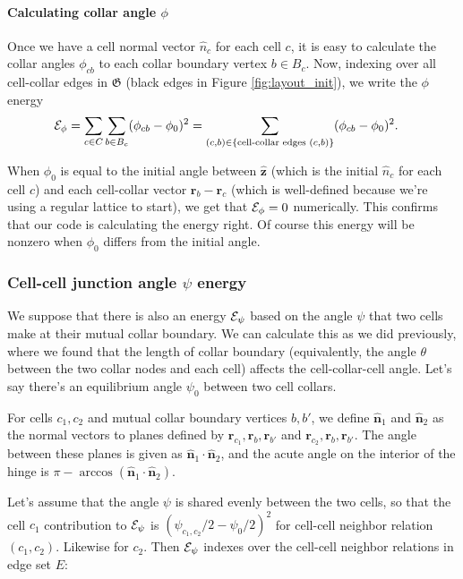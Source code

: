 \paragraph{Calculating collar angle $\phi$}
Once we have a cell normal vector $\hat{n}_c$ for each cell $c$, it is easy to calculate the collar angles $\phi_{cb}$ to each collar boundary vertex $b\in B_c$. Now, indexing over all cell-collar edges in $\mathfrak{G}$ (black edges in Figure \ref{fig:layout_init}), we write the $\phi$ energy
\begin{align*}
    \mathcal{E}_\phi &= \sum_{c\in C} \sum_{b \in B_c} (\phi_{cb} - \phi_0)^2 = \sum_{(c,b) \in \{\text{cell-collar edges }(c,b) \}} (\phi_{cb} - \phi_0)^2.
\end{align*}

When $\phi_0$ is equal to the initial angle between $\hat{\bm{z}}$ (which is the initial $\hat{n}_c$ for each cell $c$) and each cell-collar vector $\bm{r}_b - \bm{r}_c$ (which is well-defined because we're using a regular lattice to start), we get that $\mathcal{E}_\phi=0$ numerically. This confirms that our code is calculating the energy right. Of course this energy will be nonzero when $\phi_0$ differs from the initial angle. 

\subsubsection{Cell-cell junction angle $\psi$ energy}

We suppose that there is also an energy $\mathcal{E}_\psi$ based on the angle $\psi$ that two cells make at their mutual collar boundary. We can calculate this as we did previously, where we found that the length of collar boundary (equivalently, the angle $\theta$ between the two collar nodes and each cell) affects the cell-collar-cell angle. Let's say there's an equilibrium angle $\psi_0$ between two cell collars.

For cells $c_1, c_2$ and mutual collar boundary vertices $b, b'$, we define $\hat{\bm{n}}_1$ and $\hat{\bm{n}}_2$ as the normal vectors to planes defined by $\bm{r}_{c_1}, \bm{r}_b, \bm{r}_{b'}$ and $\bm{r}_{c_2}, \bm{r}_b, \bm{r}_{b'}$. The angle between these planes is given as $\hat{\bm{n}}_1 \cdot \hat{\bm{n}}_2$, and the acute angle on the interior of the hinge is $\pi - \arccos \left( \hat{\bm{n}}_1 \cdot \hat{\bm{n}}_2 \right)$. 

Let's assume that the angle $\psi$ is shared evenly between the two cells, so that the cell $c_1$ contribution to $\mathcal{E}_\psi$ is $(\psi_{c_1, c_2} / 2 - \psi_0/2)^2$ for cell-cell neighbor relation $(c_1, c_2)$. Likewise for $c_2$. Then $\mathcal{E}_\psi$ indexes over the cell-cell neighbor relations in edge set $E$:

